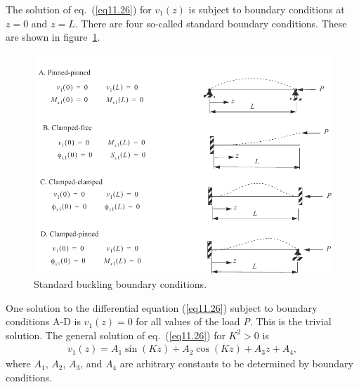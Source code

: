 \documentclass{AeroStructure-ERJohnson}
\begin{document}
\vspace*{-1pc}

The solution of eq.~(\ref{eq11.26}) for $ v_{1}(z) $ is subject to boundary conditions at $z= 0$ and $z =L$. There are four so-called standard boundary conditions. These are shown in figure~\ref{fig11.4}.

\begin{figure}[!t]
\vspace*{-1.6\baselineskip}
\centerline{\includegraphics{Figure_11-4.pdf}}
\caption{Standard buckling boundary conditions.} \label{fig11.4}
\end{figure}


One solution to the differential equation (\ref{eq11.26}) subject to boundary conditions A-D is $ v_{1}(z)=0 $ for all values of the load \textit{P}. This is the trivial solution. The general solution of eq.~(\ref{eq11.26}) for $ K^{2}>0 $ is
\begin{align}
v_{1}(z)=A_{1} \sin (K z)+A_{2} \cos (K z)+A_{3} z+A_{4} , \label{eq11.29}
\end{align}
where $\textit{A}_{1}$, $\textit{A}_{2}$, $\textit{A}_{3}$, and $\textit{A}_{4}$ are arbitrary constants to be determined by boundary conditions.
\vspace*{5pt}
\pagebreak
\end{document}
